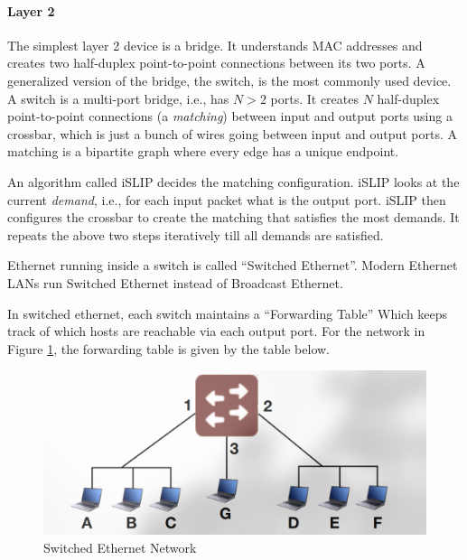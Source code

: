 \paragraph{Layer 2} The simplest layer 2 device is a bridge. It understands
MAC addresses and creates two half-duplex point-to-point connections
between its two ports. A generalized version of the bridge, the switch,
is the most commonly used device. A switch is a multi-port bridge, i.e.,
has $N > 2$ ports. It creates $N$ half-duplex point-to-point connections
(a \emph{matching}) between input and output ports using a crossbar,
which is just a bunch of wires going between input and output ports.
A matching is a bipartite graph
where every edge has a unique endpoint.

An algorithm
called iSLIP decides the matching configuration.
iSLIP looks at the current \emph{demand}, i.e., for each input packet
what is the output port.
iSLIP then configures the crossbar to create the matching that satisfies
the most demands.
It repeats the above two steps iteratively till all demands are satisfied.

Ethernet running inside a switch is called “Switched Ethernet”.
Modern Ethernet LANs run Switched Ethernet
instead of Broadcast Ethernet.

In switched ethernet, each switch maintains a “Forwarding Table”
Which keeps track of which hosts are reachable via each output port.
For the network in Figure \ref{fig:switchedethernetnetwork}, the
forwarding table is given by the table below.
\begin{figure}
    \includegraphics{images/switchedethernetnetwork.png}
    \caption{Switched Ethernet Network}
    \label{fig:switchedethernetnetwork}
\end{figure}

